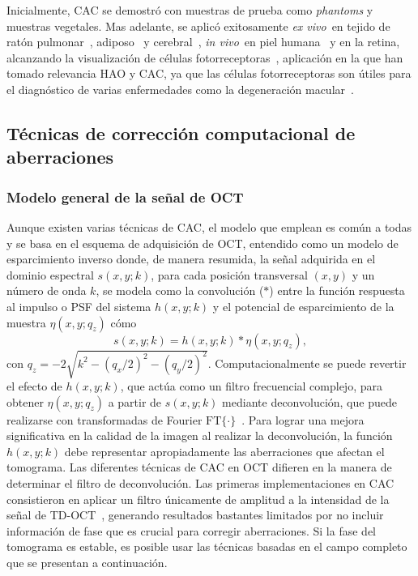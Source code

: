 \documentclass[letter, 12 pt]{article}
\newcommand{\invi}{\textit{in vivo}\ }
\newcommand{\exvi}{\textit{ex vivo}\ }
\begin{document}
Inicialmente, CAC se demostró con muestras de prueba como \textit{phantoms} y muestras vegetales. Mas adelante, se aplicó exitosamente \exvi en tejido de ratón pulmonar~\cite{adie2012}, adiposo~\cite{pande2016} y cerebral~\cite{south2019}, \invi en piel humana~\cite{liu2014} y en la retina, alcanzando la visualización de células fotorreceptoras~\cite{hillmann2016,pande2016}, aplicación en la que han tomado relevancia HAO y CAC, ya que las células fotorreceptoras son útiles para el diagnóstico de varias enfermedades como la degeneración macular~\cite{liu2017}.

	\subsection{Técnicas de corrección computacional de aberraciones}

	\subsubsection{Modelo general de la señal de OCT}

Aunque existen varias técnicas de CAC, el modelo que emplean es común a todas y se basa en el esquema de adquisición de OCT, entendido como un modelo de esparcimiento inverso donde, de manera resumida, la señal adquirida en el dominio espectral $s(x,y;k)$, para cada posición transversal $(x,y)$ y un número de onda $k$, se modela como la convolución ($\ast$) entre la función respuesta al impulso o PSF del sistema $h(x, y; k)$ y el potencial de esparcimiento de la muestra $\eta(x,y;q_z)$ cómo~\cite{kumar2015}
    \begin{equation}\label{eq.ConvOCT}
s(x,y;k) = h(x,y;k) * \eta(x,y;q_z),
    \end{equation}
con $q_z=-2\sqrt{k^2 - (q_x/2)^2 - (q_y/2)^2}$. Computacionalmente se puede revertir el efecto de $h(x,y;k)$, que actúa como un filtro frecuencial complejo, para obtener $\eta(x,y;q_z)$ a partir de $s(x,y;k)$ mediante deconvolución, que puede realizarse con transformadas de Fourier $\text{FT}\{\cdot\}$~\cite{kumar2015}. Para lograr una mejora significativa en la calidad de la imagen al realizar la deconvolución, la función $h(x,y;k)$ debe representar apropiadamente las aberraciones que afectan el tomograma. Las diferentes técnicas de CAC en OCT difieren en la manera de determinar el filtro de deconvolución. Las primeras implementaciones en CAC consistieron en aplicar un filtro únicamente de amplitud a la intensidad de la señal de TD-OCT~\cite{Ralston2005_Gaussian}, generando resultados bastantes limitados por no incluir información de fase que es crucial para corregir aberraciones. Si la fase del tomograma es estable, es posible usar las técnicas basadas en el campo completo que se presentan a continuación.
\end{document}

